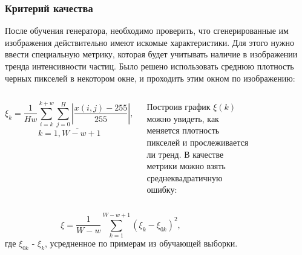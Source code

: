 \documentclass[9pt]{beamer}
\begin{document}
\begin{frame}\frametitle{Критерий качества}
	После обучения генератора, необходимо проверить, что сгенерированные им изображения действительно имеют искомые характеристики. Для этого нужно ввести специальную метрику, которая будет учитывать наличие в изображении тренда интенсивности частиц. Было решено использовать среднюю плотность черных пикселей в некотором окне, и проходить этим окном по изображению:
	\begin{columns}
			\begin{center}
				$$\xi_k = \frac{1}{H w}{\sum_{i=k}^{k+w} \sum_{j=0}^{H}\left| \frac{x(i, j) - 255}{255} \right|}, $$$$k = \overline{1, W - w + 1} $$
			\end{center}
			Построив график $\xi(k)$ можно увидеть, как меняется плотность пикселей и прослеживается ли тренд. В качестве метрики можно взять среднеквадратичную ошибку:
			\begin{figure}
			\end{figure}
	\end{columns}
	\begin{columns}
		\column{0.5\linewidth}
			$$ \xi = \frac{1}{W-w}\sum_{k=1}^{W-w+1} (\xi_k - \xi_{0k})^2,$$
		\column{0.5\linewidth}
			где $\xi_{0k}$ - $\xi_k$, усредненное по примерам из обучающей выборки.
	\end{columns}
\end{frame}
\end{document}
